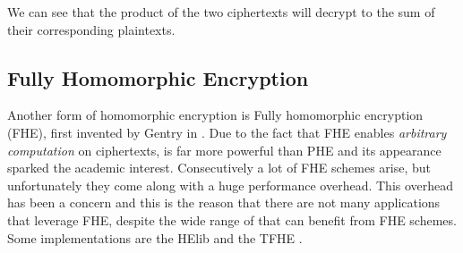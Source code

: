 We can see that the product of the two ciphertexts will decrypt to the sum of their corresponding plaintexts.

\subsection{Fully Homomorphic Encryption}\label{ss:fhe}
Another form of homomorphic encryption is Fully homomorphic encryption (FHE), first invented by Gentry in \cite{gentry2009fully}.
Due to the fact that FHE enables \textit{arbitrary computation} on ciphertexts, is far more powerful than PHE and its appearance sparked the academic interest.
Consecutively a lot of FHE schemes arise, but unfortunately they come along with a huge performance overhead.
This overhead has been a concern and this is the reason that there are not many applications that leverage FHE, despite the wide range of that can benefit from FHE schemes.
Some implementations are the HElib \cite{halevi2014algorithms} and the TFHE \cite{chillotti2016faster}.



